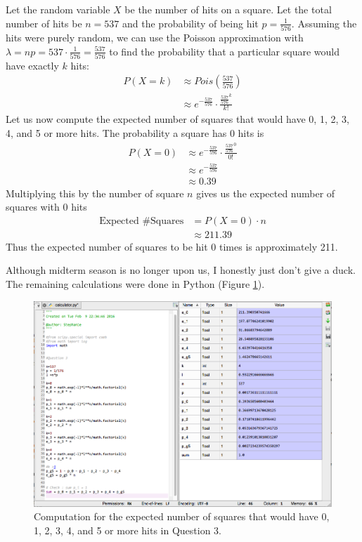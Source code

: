 \documentclass[11pt, oneside]{article}   	%
\begin{document}
Let the random variable $X$ be the number of hits on a square. Let the total number of hits be $n=537$ and the probability of being hit $p=\frac{1}{576}$. Assuming the hits were purely random, we can use the Poisson approximation with $\lambda = np = 537 \cdot \frac{1}{576} = \frac{537}{576}$ to find the probability that a particular square would have exactly $k$ hits:
\begin{align*}
	P(X=k) & \approx Pois(\frac{537}{576}) \\
	& \approx e^{-\frac{537}{576}} \cdot \frac{\frac{537}{576}^k}{k!}
\end{align*}
Let us now compute the expected number of squares that would have 0, 1, 2, 3, 4, and 5 or more hits. The probability a square has 0 hits is
\begin{align*}
	P(X=0) & \approx e^{-\frac{537}{576}} \cdot \frac{\frac{537}{576}^0}{0!} \\
	& \approx  e^{-\frac{537}{576}} \\
	& \approx 0.39
\end{align*}
Multiplying this by the number of square $n$ gives us the expected number of squares with 0 hits
\begin{align*}
	\text{Expected \# Squares} & = P(X=0) \cdot n \\
	& \approx 211.39
\end{align*}
Thus the expected number of squares to be hit 0 times is approximately 211. 

Although midterm season is no longer upon us, I honestly just don't give a duck. The remaining calculations were done in Python (Figure \ref{lazy}). 
    \begin{figure}[h]                                         
    \begin{center}
        \includegraphics[width=.95\textwidth]{lazy.png}  
        \caption{Computation for the expected number of squares that would have 0, 1, 2, 3, 4, and 5 or more hits in Question 3.} 
        \label{lazy} 
    \end{center}
    \end{figure}
    
\end{document}
